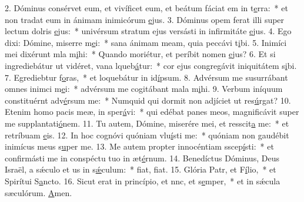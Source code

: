 2. Dóminus consérvet eum, et vivíficet eum, et beátum fáciat em in t\uline{e}rra:~* et non tradat eum in ánimam inimicórum \uline{e}jus.
3. Dóminus opem ferat illi super lectum dolris \uline{e}jus:~* univérsum stratum ejus versásti in infirmitáte \uline{e}jus.
4. Ego dixi: Dómine, miserre m\uline{e}i:~* sana ánimam meam, quia peccávi t\uline{i}bi.
5. Inimíci mei dixérunt mla m\uline{i}hi:~* Quando moriétur, et períbit nomen \uline{e}jus?
6. Et si ingrediebátur ut vidéret, vana lqueb\uline{á}tur:~* cor ejus congregávit iniquitátem s\uline{i}bi.
7. Egrediebtur f\uline{o}ras,~* et loquebátur in id\uline{í}psum.
8. Advérsum me susurrábant omnes inimci m\uline{e}i:~* advérsum me cogitábant mala m\uline{i}hi.
9. Verbum iníquum constituérnt adv\uline{é}rsum me:~* Numquid qui dormit non adjíciet ut res\uline{ú}rgat?
10. Etenim homo pacis meæ, in  sper\uline{á}vi:~* qui edébat panes meos, magnificávit super me supplantati\uline{ó}nem.
11. Tu autem, Dómine, miserére mei, et resscit\uline{a} me:~* et retríbuam \uline{e}is.
12. In hoc cognóvi quóniam vlu\uline{í}sti me:~* quóniam non gaudébit inimícus meus s\uline{u}per me.
13. Me autem propter innocéntiam sscep\uline{í}sti:~* et confirmásti me in conspéctu tuo in æt\uline{é}rnum.
14. Benedíctus Dóminus, Deus Israël, a sǽculo et us in s\uline{ǽ}culum:~* fiat, f\uline{i}at.
15. Glória Patr, et F\uline{í}lio,~* et Spirítui S\uline{a}ncto.
16. Sicut erat in princípio, et nnc, et s\uline{e}mper,~* et in sǽcula sæculórum. \uline{A}men.
